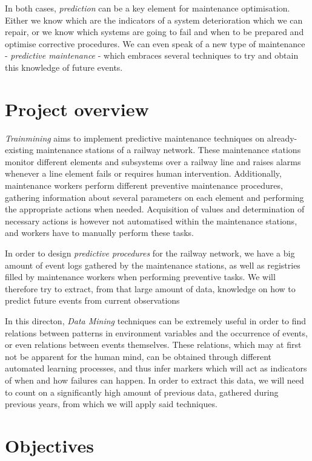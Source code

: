 \documentclass[a4paper,10pt]{article}
\begin{document}
In both cases, \emph{prediction} can be a key element for maintenance optimisation. Either we know which are the indicators of a system deterioration which we can repair, or we know which systems are going to fail and when to be prepared and optimise corrective procedures. We can even speak of a new type of maintenance - \emph{predictive maintenance} - which embraces several techniques to try and obtain this knowledge of future events.

\section{Project overview}
\emph{Trainmining} aims to implement predictive maintenance techniques on already-existing maintenance stations of a railway network. These maintenance stations monitor different elements and subsystems over a railway line and raises alarms whenever a line element fails or requires human intervention. Additionally, maintenance workers perform different preventive maintenance procedures, gathering information about several parameters on each element and performing the appropriate actions when needed. Acquisition of values and determination of necessary actions is however not automatised within the maintenance stations, and workers have to manually perform these tasks.

In order to design \emph{predictive procedures} for the railway network, we have a big amount of event logs gathered by the maintenance stations, as well as registries filled by maintenance workers when performing preventive tasks. We will therefore try to extract, from that large amount of data, knowledge on how to predict future events from current observations

In this directon, \emph{Data Mining} techniques can be extremely useful in order to find relations between patterns in environment variables and the occurrence of events, or even relations between events themselves. These relations, which may at first not be apparent for the human mind, can be obtained through different automated learning processes, and thus infer markers which will act as indicators of when and how failures can happen. In order to extract this data, we will need to count on a significantly high amount of previous data, gathered during previous years, from which we will apply said techniques.

\section{Objectives}
\end{document}
